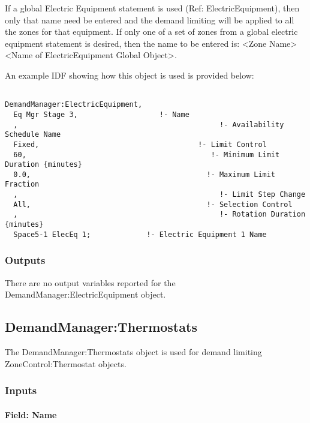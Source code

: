 If a global Electric Equipment statement is used (Ref: ElectricEquipment), then only that name need be entered and the demand limiting will be applied to all the zones for that equipment. If only one of a set of zones from a global electric equipment statement is desired, then the name to be entered is: \textless{}Zone Name\textgreater{} \textless{}Name of ElectricEquipment Global Object\textgreater{}.

An example IDF showing how this object is used is provided below:

\begin{lstlisting}

DemandManager:ElectricEquipment,
  Eq Mgr Stage 3,                   !- Name
  ,                                               !- Availability Schedule Name
  Fixed,                                     !- Limit Control
  60,                                           !- Minimum Limit Duration {minutes}
  0.0,                                         !- Maximum Limit Fraction
  ,                                               !- Limit Step Change
  All,                                         !- Selection Control
  ,                                               !- Rotation Duration {minutes}
  Space5-1 ElecEq 1;             !- Electric Equipment 1 Name
\end{lstlisting}

\subsubsection{Outputs}\label{outputs-3-003}

There are no output variables reported for the DemandManager:ElectricEquipment object.

\subsection{DemandManager:Thermostats}\label{demandmanagerthermostats}

The DemandManager:Thermostats object is used for demand limiting ZoneControl:Thermostat objects.

\subsubsection{Inputs}\label{inputs-4-007}

\paragraph{Field: Name}\label{field-name-4-007}

